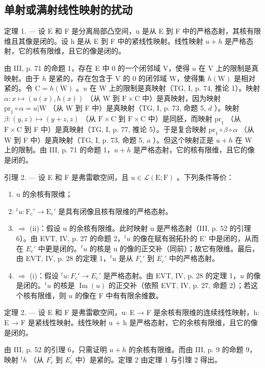 \subsection{单射或满射线性映射的扰动}

定理 1. --- 设 E 和 F 是分离局部凸空间，u 是从 E 到 F 中的严格态射，其核有限维且其像是闭的。设 h 是从 E 到 F 中的紧线性映射。线性映射 \(u + h\) 是严格态射，它的核有限维，且它的像是闭的。

由 III, p. 71 的命题 1，存在 E 中 0 的一个闭邻域 V，使得 \(u\) 在 V 上的限制是真映射。由于 \(h\) 是紧的，存在包含于 V 的 0 的闭邻域 W，使得集 \(h(\mathrm{W})\) 是相对紧的。令 \(\mathrm{C} = \overline{h(\mathrm{W})}\) 。\(u\) 在 W 上的限制是真映射（TG, I, p. 74, 推论 1）。映射 \(\alpha: x \mapsto (u(x), h(x))\) （从 W 到 \(\mathrm{F} \times \mathrm{C}\) 中）是真映射，因为映射 \(\mathrm{pr}_1 \circ \alpha = u|\mathrm{W}\) （从 W 到 F 中）是真映射（TG, I, p. 73, 命题 5, \(d\) ）。映射 \(\beta: (y, z) \mapsto (y + z, z)\) （从 \(\mathrm{F} \times \mathrm{C}\) 到 \(\mathrm{F} \times \mathrm{C}\) 中）是同胚，而映射 \(\mathrm{pr}_1\) （从 \(\mathrm{F} \times \mathrm{C}\) 到 F 中）是真映射（TG, I, p. 77, 推论 5）。于是复合映射 \(\mathrm{pr}_1 \circ \beta \circ \alpha\) （从 W 到 F 中）是真映射（TG, I, p. 73, 命题 5, \(a\) ）。但这个映射正是 \(u + h\) 在 W 上的限制。由 III, p. 71 的命题 1，\(u + h\) 是严格态射，它的核有限维，且它的像是闭的。

引理 2. --- 设 E 和 F 是弗雷歇空间，且 \(u \in \mathcal{L}(\mathrm{E};\mathrm{F})\) 。下列条件等价：

\begin{enumerate}
\def\labelenumi{(\roman{enumi})}
\item
  u 的余核有限维；
\item
  \(^{t}u \colon \mathrm{F}_c' \to \mathrm{E}_c'\) 是具有闭像且核有限维的严格态射。
\item
  \(\Longrightarrow\) (ii)：假设 u 的余核有限维。此时映射 u 是严格态射（III, p. 52 的引理 6）。由 EVT, IV, p. 27 的命题 2，\(^{t}u\) 的像在赋有弱拓扑的 E' 中是闭的，从而在 \(E_{c}'\) 中更是闭的。\(^{t}u\) 的核是 u 的像的正交补（同前）；故它有限维。最后，由 EVT, IV, p. 28 的定理 1，\(^{t}u\) 是从 \(F_{c}'\) 到 \(E_{c}'\) 中的严格态射。
\item
  \(\Longrightarrow\) (i)：假设 \(^t u\colon F_c' \to E_c'\) 是严格态射。由 EVT, IV, p. 28 的定理 1，\(u\) 的像是闭的。\(^t u\) 的核是 \(\operatorname{Im}(u)\) 的正交补（依照 EVT, IV, p. 27, 命题 2）；若这个核有限维，则 \(u\) 的像在 F 中有有限余维数。
\end{enumerate}

定理 2. --- 设 E 和 F 是弗雷歇空间，u: E → F 是余核有限维的连续线性映射，h: E → F 是紧线性映射。线性映射 u + h 是严格态射，它的余核有限维，且它的像是闭的。

由 III, p. 52 的引理 6，只需证明 \(u + h\) 的余核有限维。而由 III, p. 9 的命题 9，映射 \(^{t}h\) （从 \(F_{c}^{\prime}\) 到 \(E_{c}^{\prime}\) 中）是紧的。定理 2 由定理 1 与引理 2 得出。

